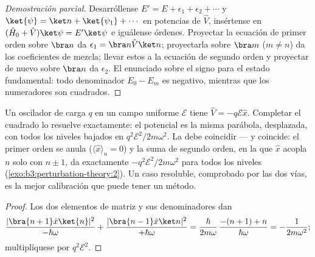 \begin{proof}[Demostración parcial]
Desarróllense $E' = E + \epsilon_1 + \epsilon_2 + \cdots$ y $\ket{\psi} =
\ket n + \ket{\psi_1} + \cdots$ en potencias de $\hat V$, insértense en
$(\hat H_0 + \hat V)\ket\psi = E'\ket\psi$ e iguálense órdenes.
Proyectar la ecuación de primer orden sobre $\bra n$ da $\epsilon_1 =
\bra n\hat V\ket n$; proyectarla sobre $\bra m$ ($m \neq n$) da los
coeficientes de mezcla; llevar estos a la ecuación de segundo orden y
proyectar de nuevo sobre $\bra n$ da $\epsilon_2$. El enunciado sobre el
signo para el estado fundamental: todo denominador $E_0 - E_m$ es negativo,
mientras que los numeradores son cuadrados.
\end{proof}

\begin{proposition}\label{prop:b3:perturbation-theory:oscillator-field}
Un oscilador de carga $q$ en un campo uniforme $\mathcal E$ tiene
$\hat V = -q\mathcal E\hat x$. Completar el cuadrado lo resuelve
exactamente: el potencial es la misma parábola, desplazada, con todos los
niveles bajados en $q^2\mathcal E^2/2m\omega^2$. La 
debe coincidir --- y coincide: el primer orden se anula ($\langle\hat
x\rangle_n = 0$) y la suma de segundo orden, en la que $\hat x$
acopla $n$ solo con $n \pm 1$, da exactamente
$-q^2\mathcal E^2/2m\omega^2$ para todos los niveles
(\cref{exo:b3:perturbation-theory:2}). Un caso resoluble, comprobado
por las dos vías, es la mejor calibración que puede tener un método.
\end{proposition}

\begin{proof}
Los dos elementos de matriz y sus denominadores dan
\[
\frac{|\bra{n+1}\hat x\ket{n}|^2}{-\hbar\omega}
 + \frac{|\bra{n-1}\hat x\ket n|^2}{+\hbar\omega}
 = \frac{\hbar}{2m\omega}\,\frac{-(n+1) + n}{\hbar\omega}
 = -\frac{1}{2m\omega^2} ;
\]
multiplíquese por $q^2\mathcal E^2$.
\end{proof}

